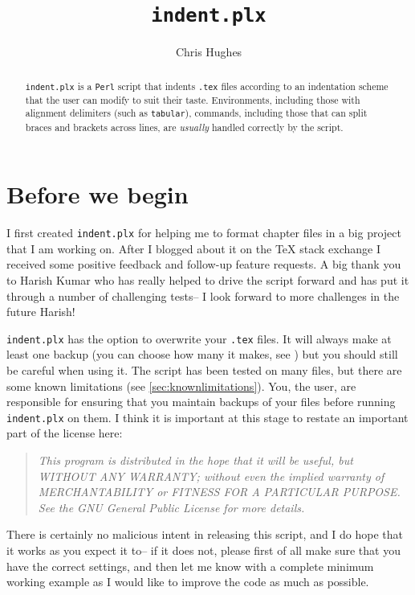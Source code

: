 \documentclass[11pt]{article}
\newcommand{\fixthis}[1]
{%
	\marginpar{\huge \color{red} \framebox{FIX}}%
	\typeout{FIXTHIS: p\thepage : #1^^J}%
}
\begin{document}
\title{\lstinline[basicstyle=\huge\ttfamily]!indent.plx!}
\author{Chris Hughes}
\maketitle
\begin{abstract}
 \lstinline!indent.plx! is a \lstinline!Perl! script that indents \lstinline!.tex!
 files according to an indentation scheme that the user can modify to suit their 
 taste. Environments, including those with alignment delimiters (such as \lstinline!tabular!), 
 commands, including those that can split braces and brackets across lines, 
 are \emph{usually} handled correctly by the script.
\end{abstract}

\tableofcontents
\lstlistoflistings

\section{Before we begin}
I first created \lstinline!indent.plx! for helping me to format chapter files 
in a big project that I am working on. After I blogged about it on the 
\TeX{} stack exchange \cite{cmhblog}\fixthis{citation} I received some positive feedback and 
follow-up feature requests. A big thank you to Harish Kumar who has really 
helped to drive the script forward and has put it through a number of challenging
tests-- I look forward to more challenges in the future Harish!

\lstinline!indent.plx! has the option to overwrite your \lstinline!.tex! files.
It will always make at least one backup (you can choose how many it makes, see )
but you should still be careful when using it. The script has been tested on many
files, but there are some known limitations (see \cref{sec:knownlimitations}). You, 
the user, are responsible for ensuring that you maintain backups of your files
before running \lstinline!indent.plx! on them. I think it is important at this
stage to restate an important part of the license here:
\begin{quote}\itshape
This program is distributed in the hope that it will be useful,
but WITHOUT ANY WARRANTY; without even the implied warranty of
MERCHANTABILITY or FITNESS FOR A PARTICULAR PURPOSE.  See the
GNU General Public License for more details.
\end{quote}
There is certainly no malicious intent in releasing this script, and I do hope
that it works as you expect it to-- if it does not, please first of all 
make sure that you have the correct settings, and then let me know with a 
complete minimum working example as I would like to improve the code as much as possible. 
\end{document}
